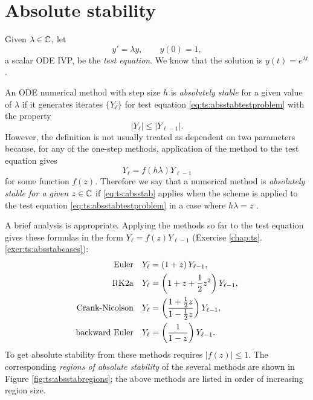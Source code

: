 \section{Absolute stability}

Given $\lambda \in \mathbb{C}$, let
\begin{equation}
y' = \lambda y, \qquad y(0)=1, \label{eq:ts:absstabtestproblem}
\end{equation}
a scalar ODE IVP, be the \emph{test equation}.  We know that the solution is $y(t) = e^{\lambda t}$.

An ODE numerical method with step size $h$ is \emph{absolutely stable} for a given value of $\lambda$ if it generates iterates $\{Y_\ell\}$ for test equation \eqref{eq:ts:absstabtestproblem} with the property
\begin{equation}
|Y_\ell| \le |Y_{\ell-1}|. \label{eq:ts:absstab}
\end{equation}
However, the definition is not usually treated as dependent on two parameters because, for any of the one-step methods, application of the method to the test equation gives
    $$Y_\ell = f(h\lambda) Y_{\ell-1}$$
for some function $f(z)$.  Therefore we say that a numerical method is \emph{absolutely stable for a given} $z\in\mathbb{C}$ if \eqref{eq:ts:absstab} applies when the scheme is applied to the test equation \eqref{eq:ts:absstabtestproblem} in a case where $h\lambda=z$ \citep{AscherPetzold1998}.

A brief analysis is appropriate.  Applying the methods so far to the test equation gives these formulas in the form $Y_\ell = f(z) Y_{\ell-1}$ (Exercise \ref{chap:ts}.\ref{exer:ts:absstabcases}):
\begin{align}
\text{Euler}              && Y_\ell &= \left(1+z\right) Y_{\ell-1}, \label{eq:ts:absstabcases} \\
\text{RK$2$a}            && Y_\ell &= \left(1+z + \frac{1}{2} z^2\right) Y_{\ell-1}, \notag \\
\text{Crank-Nicolson}     && Y_\ell &= \left(\frac{1+\frac{1}{2} z}{1-\frac{1}{2}z}\right) Y_{\ell-1}, \notag \\
\text{backward Euler}     && Y_\ell &= \left(\frac{1}{1-z}\right) Y_{\ell-1}. \notag
\end{align}
To get absolute stability from these methods requires $|f(z)|\le 1$.  The corresponding \emph{regions of absolute stability} of the several methods are shown in Figure \ref{fig:ts:absstabregions}; the above methods are listed in order of increasing region size.


